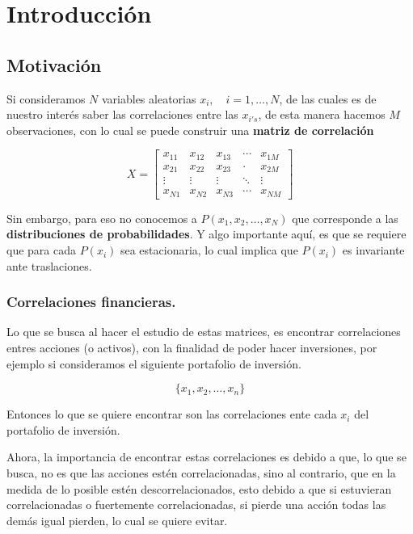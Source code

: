 \chapter*{Introducción}
\label{cap:intro}

\section{Motivación}

Si consideramos $N$ variables aleatorias $x_i, \quad i = 1,\dots, N$, de las cuales es de nuestro interés saber las correlaciones entre las $x_{i's}$, de esta manera hacemos $M$ observaciones, con lo cual se puede construir una \textbf{matriz de correlación}

\begin{equation}
   X = 
    \begin{bmatrix}
        x_{11} & x_{12} & x_{13}& \cdots & x_{1M}\\
        x_{21} & x_{22} & x_{23}& \cdot & x_{2M}\\
        \vdots & \vdots & \vdots & \ddots & \vdots\\
        x_{N1} & x_{N2} & x_{N3} & \cdots & x_{NM}
    \end{bmatrix}
\end{equation}

Sin embargo, para eso no conocemos a $P(x_1,x_2,\dots, x_N)$ que corresponde a las \textbf{distribuciones de probabilidades}. Y algo importante aquí, es que se requiere que para cada $P(x_i)$ sea estacionaria, lo cual implica que $P(x_i)$ es invariante ante traslaciones.

\subsection{Correlaciones financieras.}

Lo que se busca al hacer el estudio de estas matrices, es encontrar correlaciones entres acciones (o activos), con la finalidad de poder hacer inversiones, por ejemplo si consideramos el siguiente portafolio de inversión.

\begin{equation}
	\{x_1,x_2,\dots,x_n\}
\end{equation}

Entonces lo que se quiere encontrar son las correlaciones ente cada $x_i$ del portafolio de inversión.

Ahora, la importancia de encontrar estas correlaciones es debido a que, lo que se busca, no es que las acciones estén correlacionadas, sino al contrario, que en la medida de lo posible estén descorrelacionados, esto debido a que si estuvieran correlacionadas o fuertemente correlacionadas, si pierde una acción todas las demás igual pierden, lo cual se quiere evitar.

